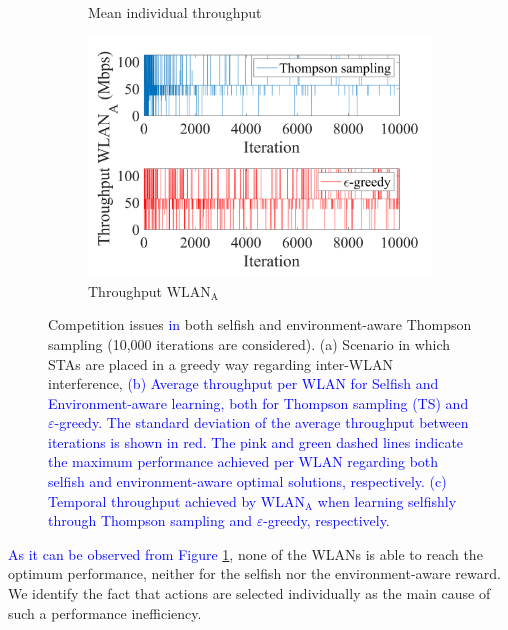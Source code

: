 \documentclass[preprint,12pt]{elsarticle}
\begin{document}
\begin{figure}[h!!!!]
\begin{subfigure}[b]{0.48\textwidth}
		\caption{Mean individual throughput}
		\label{fig:4_grid_selfish_adversarial_mean_tpt}
	\end{subfigure}
	\begin{subfigure}[b]{0.36\textwidth}
		\includegraphics[width=\textwidth]{experiment_2_3_variability}
		\caption{Throughput $\text{WLAN}_\text{A}$}
		\label{fig:experiment_2_3_variability}
	\end{subfigure}
	\caption{Competition issues \textcolor{blue}{in} both selfish and environment-aware Thompson sampling (10,000 iterations are considered). (a) Scenario in which STAs are placed in a greedy way regarding inter-WLAN interference, \textcolor{blue}{(b) Average throughput per WLAN for Selfish and Environment-aware learning, both for Thompson sampling (TS) and $\varepsilon$-greedy. The standard deviation of the average throughput between iterations is shown in red. The pink and green dashed lines indicate the maximum performance achieved per WLAN regarding both selfish and environment-aware optimal solutions, respectively. (c) Temporal throughput achieved by $\text{WLAN}_\text{A}$ when learning selfishly through Thompson sampling and $\varepsilon$-greedy, respectively.}}
	\label{fig:4_grid_selfish_adversarial}
\end{figure}

\textcolor{blue}{As it can be observed from Figure \ref{fig:4_grid_selfish_adversarial_mean_tpt}}, none of the WLANs is able to reach the optimum performance, neither for the selfish nor the environment-aware reward. We identify the fact that actions are selected individually as the main cause of such a performance inefficiency. 
\end{document}
